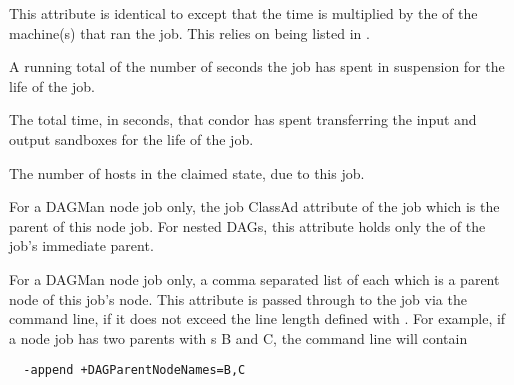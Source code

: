 \begin{description}
\label{CumulativeSlotTime}
\item[\AdAttr{CumulativeSlotTime}:] This attribute is identical to
 except that the time is multiplied by the
 of the machine(s) that ran the job.  This relies
on  being listed in .

\item[\AdAttr{CumulativeSuspensionTime}:]  A running total of the number of
seconds the job has spent in suspension for the life of the job.

\label{CumulativeTransferTime}
\item[\AdAttr{CumulativeTransferTime}:] The total time, in seconds, that 
condor has spent transferring the input and output sandboxes for the life of the job.

\item[\AdAttr{CurrentHosts}:]  The number of hosts in the claimed state,
due to this job.

\item[\AdAttr{DAGManJobId}:] For a DAGMan node job only,
the  job ClassAd attribute
of the  job which is the parent of this node job.
For nested DAGs, this attribute holds only the  of
the job's immediate parent.

\item[\AdAttr{DAGParentNodeNames}:] For a DAGMan node job only,
a comma separated list of each  which is a parent node of
this job's node.
This attribute is passed through to the job via the 
command line, if it does not exceed the line length defined with
. For example, if a node job has two parents
with s B and C, the  command line will 
contain
\begin{verbatim}
  -append +DAGParentNodeNames=B,C
\end{verbatim}


\end{description}
